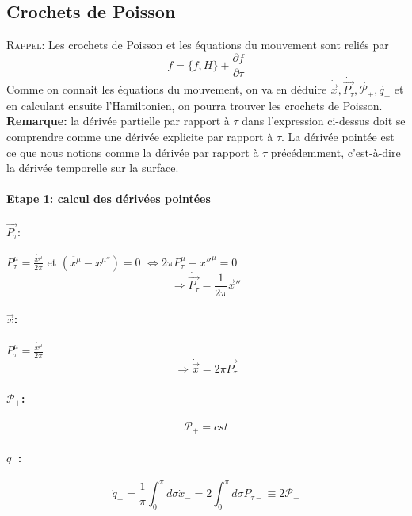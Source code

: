 \documentclass[a4paper,12pt]{article}
\def\xmu{x^\mu}
\def\vecx{\vec{x}}
\def\CP{\mathcal{P}}
\def\pt{P_\tau}
\def\vecpt{\vec{\pt}}
\begin{document}
\subsection{Crochets de Poisson}
\textsc{Rappel:} Les crochets de Poisson et les équations du mouvement sont reliés par 
$$\dot{f}=\{f,H\}+\frac{\partial f}{\partial \tau}$$
Comme on connait les équations du mouvement, on va en déduire $\dot{\vecx}, \dot{\vecpt}, \dot{\CP_+}, \dot{q_-}$  et en calculant ensuite l'Hamiltonien, on pourra trouver les crochets de Poisson.\\
\textbf{Remarque:} la dérivée partielle par rapport à $\tau$ dans l'expression ci-dessus doit se comprendre comme une dérivée explicite par rapport à $\tau$. La dérivée pointée est ce que nous notions comme la dérivée par rapport à $\tau$ précédemment, c'est-à-dire la dérivée temporelle sur la surface.\\
\paragraph*{Etape 1: calcul des dérivées pointées}
\paragraph{$\vecpt:$}
$\pt^\mu=\frac{\dot{\xmu}}{2\pi}$ et $\left( \ddot{\xmu}-x^{\mu''} \right)=0$
$\Leftrightarrow 2\pi\dot{\pt^\mu}-x''^\mu=0$
$$\Rightarrow \dot{\vecpt}=\frac{1}{2\pi}\vecx''$$
\paragraph{$\vecx$:}
$\pt^\mu=\frac{\dot{\xmu}}{2\pi}$  $$\Rightarrow \dot{\vecx}=2\pi\vecpt$$
\paragraph{$\CP_+$:}
$$\CP_+= cst$$ 
\paragraph{$q_-$:}
$$\dot{q}_-=\frac{1}{\pi}\int_0^\pi d\sigma \dot{x}_-= 2\int_0^\pi d\sigma P_{\tau -}\equiv 2 \CP_-$$
\end{document}
